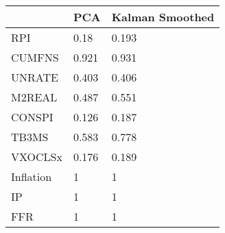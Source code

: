 \begin{tabular}{lll}
\toprule 
& PCA & Kalman Smoothed \\ 
\midrule 
RPI & 0.18 & 0.193 \\ 
CUMFNS & 0.921 & 0.931 \\ 
UNRATE & 0.403 & 0.406 \\ 
M2REAL & 0.487 & 0.551 \\ 
CONSPI & 0.126 & 0.187 \\ 
TB3MS & 0.583 & 0.778 \\ 
VXOCLSx & 0.176 & 0.189 \\ 
Inflation & 1 & 1 \\ 
IP & 1 & 1 \\ 
FFR & 1 & 1 \\ 
\bottomrule 
\end{tabular}